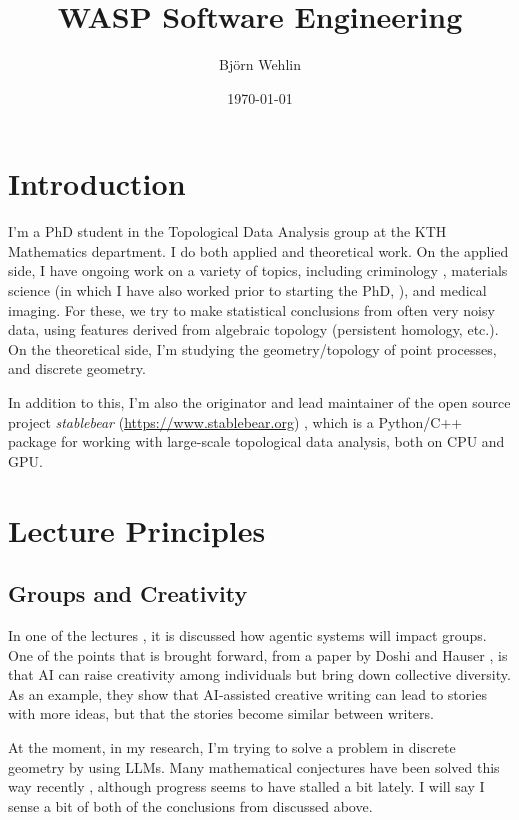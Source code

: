 \documentclass[a4paper,11pt]{article}
\title{WASP Software Engineering}
\author{Bj\"orn Wehlin}
\date{\today}
\begin{document}
\maketitle

\section{Introduction}

I'm a PhD student in the Topological Data Analysis group at the KTH Mathematics department. I do both applied and theoretical work. On the applied side, I have ongoing work on a variety of topics, including criminology \cite{wehlin2025poznan}, materials science (in which I have also worked prior to starting the PhD, \cite{cybart2015nano}), and medical imaging. For these, we try to make statistical conclusions from often very noisy data, using features derived from algebraic topology (persistent homology, etc.). On the theoretical side, I'm studying the geometry/topology of point processes, and discrete geometry.

In addition to this, I'm also the originator and lead maintainer of the open source project \emph{stablebear} (\url{https://www.stablebear.org}) \cite{stablebear}, which is a Python/C++ package for working with large-scale topological data analysis, both on CPU and GPU.

\section{Lecture Principles}

\subsection{Groups and Creativity}

In one of the lectures \cite{feldt2026agentic}, it is discussed how agentic systems will impact groups. One of the points that is brought forward, from a paper by Doshi and Hauser \cite{doshi2024generative}, is that AI can raise creativity among individuals but bring down collective diversity. As an example, they show that AI-assisted creative writing can lead to stories with more ideas, but that the stories become similar between writers.

At the moment, in my research, I'm trying to solve a problem in discrete geometry by using LLMs. Many mathematical conjectures have been solved this way recently \cite{vibemathed}, although progress seems to have stalled a bit lately. I will say I sense a bit of both of the conclusions from \cite{doshi2024generative} discussed above. 
\end{document}
